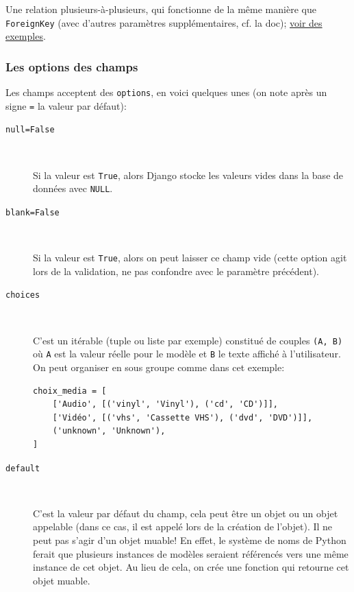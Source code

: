 \documentclass[a4paper, 10pt]{article}
\begin{document}
{\begin{description}
    Une relation plusieurs-à-plusieurs, qui fonctionne de la même manière que \texttt{ForeignKey} (avec d'autres paramètres supplémentaires, cf. la doc); \href{https://docs.djangoproject.com/fr/2.0/topics/db/examples/many_to_many/}{voir des exemples}.
\end{description}

\subsubsection{Les options des champs}
Les champs acceptent des \texttt{options}, en voici quelques unes (on note après un signe \texttt{=} la valeur par défaut):
\begin{description}
    \item[\texttt{null=False}]~

    Si la valeur est \texttt{True}, alors Django stocke les valeurs vides dans la base de données avec \texttt{NULL}.

    \item[\texttt{blank=False}]~

    Si la valeur est \texttt{True}, alors on peut laisser ce champ vide (cette option agit lors de la validation, ne pas confondre avec le paramètre précédent).

    \item[\texttt{choices}]~

    C'est un itérable (tuple ou liste par exemple) constitué de couples \texttt{(A, B)} où \texttt{A} est la valeur réelle pour le modèle et \texttt{B} le texte affiché à l'utilisateur. On peut organiser en sous groupe comme dans cet exemple:

    \begin{verbatim}
choix_media = [
    ['Audio', [('vinyl', 'Vinyl'), ('cd', 'CD')]],
    ['Vidéo', [('vhs', 'Cassette VHS'), ('dvd', 'DVD')]],
    ('unknown', 'Unknown'),
]
    \end{verbatim}

    \item[\texttt{default}]~

    C'est la valeur par défaut du champ, cela peut être un objet ou un objet appelable (dans ce cas, il est appelé lors de la création de l'objet). Il ne peut pas s'agir d'un objet muable! En effet, le système de noms de Python ferait que plusieurs instances de modèles seraient référencés vers une même instance de cet objet. Au lieu de cela, on crée une fonction qui retourne cet objet muable.


\end{description}}
\end{document}
